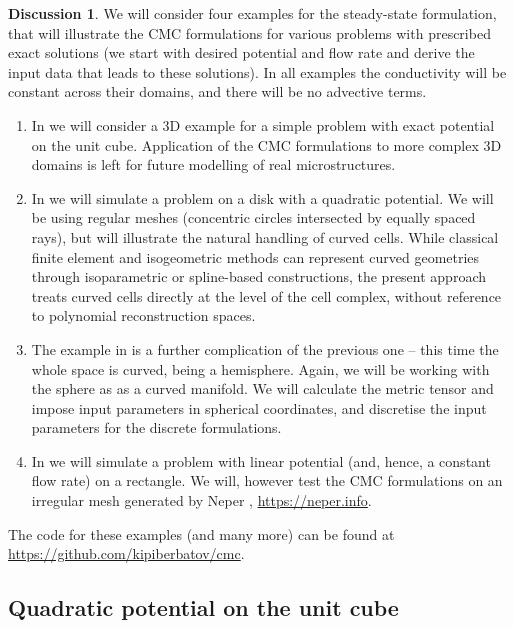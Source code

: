 \documentclass{elsarticle}
\theoremstyle{definition}
\newtheorem{discussion}[theorem]{Discussion}
\begin{document}
\begin{discussion}
  We will consider four examples for the steady-state formulation, that will illustrate the CMC formulations for various problems with prescribed exact solutions (we start with desired potential and flow rate and derive the input data that leads to these solutions).
  In all examples the conductivity will be constant across their domains, and there will be no advective terms.
  \begin{enumerate}
    \item
      In  we will consider a $3$D example for a simple problem with exact potential on the unit cube.
      Application of the CMC formulations to more complex $3$D domains is left for future modelling of real microstructures.
    \item
      In  we will simulate a problem on a disk with a quadratic potential.
      We will be using regular meshes (concentric circles intersected by equally spaced rays), but will illustrate the natural handling of curved cells.
      While classical finite element and isogeometric methods can represent
      curved geometries through isoparametric or spline-based constructions,
      the present approach treats curved cells directly at the level of the cell
      complex, without reference to polynomial reconstruction spaces.
    \item
      The example in  is a further complication of the previous one -- this time the whole space is curved, being a hemisphere.
      Again, we will be working with the sphere as as a curved manifold.
      We will calculate the metric tensor and impose input parameters in spherical coordinates, and discretise the input parameters for the discrete formulations.
    \item
      In  we will simulate a problem with linear potential (and, hence, a constant flow rate) on a rectangle.
      We will, however test the CMC formulations on an irregular mesh generated by Neper \cite{quey2011large}, \url{https://neper.info}.
  \end{enumerate}
  The code for these examples (and many more) can be found at \url{https://github.com/kipiberbatov/cmc}.
\end{discussion}

\subsection{Quadratic potential on the unit cube}
\label{sec:simulations/cube}
\phantom{T}
\end{document}
